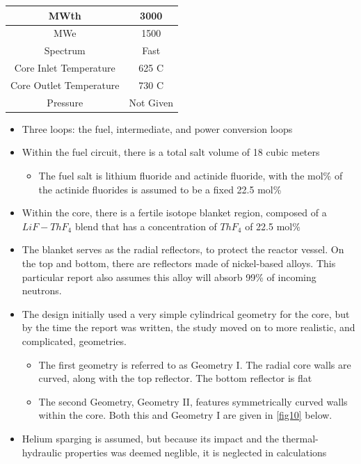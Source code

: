 \documentclass[letterpaper]{article}
\begin{document}
\begin{center}
\begin{tabular}{|c|c|}
\hline
MWth & 3000 \\
\hline
MWe & 1500 \\
\hline
Spectrum & Fast \\
\hline
Core Inlet Temperature & 625 C \\
\hline
Core Outlet Temperature & 730 C \\
\hline
Pressure & Not Given \\
\hline
\end{tabular}
\end{center}

\begin{itemize}
\item Three loops: the fuel, intermediate, and power conversion loops
\item Within the fuel circuit, there is a total salt volume of 18 cubic meters
	\begin{itemize}
	\item The fuel salt is lithium fluoride and actinide fluoride, with the mol\% of the actinide fluorides is assumed to be a fixed 22.5 mol\%
	\end{itemize}
\item Within the core, there is a fertile isotope blanket region, composed of a $LiF - ThF_4$ blend that has a concentration of $ThF_4$ of 22.5 mol\%
\item The blanket serves as the radial reflectors, to protect the reactor vessel.  On the top and bottom, there are reflectors made of nickel-based alloys.  This particular report also assumes this alloy will absorb 99\% of incoming neutrons.
\item The design initially used a very simple cylindrical geometry for the core, but by the time the report was written, the study moved on to more realistic, and complicated, geometries.
	\begin{itemize}
	\item The first geometry is referred to as Geometry I.  The radial core walls are curved, along with the top reflector.  The bottom reflector is flat
	\item The second Geometry, Geometry II, features symmetrically curved walls within the core.  Both this and Geometry I are given in \ref{fig10} below.
	\end{itemize}
\item Helium sparging is assumed, but because its impact and the thermal-hydraulic properties was deemed neglible, it is neglected in calculations
\end{itemize} 
\end{document}

